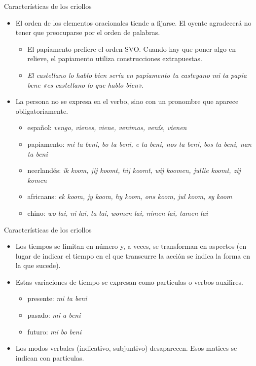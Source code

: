 \documentclass[handout]{beamer}
\begin{document}
\begin{frame}{Características de los criollos}
\begin{itemize}
	\item El orden de los elementos oracionales tiende a fijarse. El oyente agradecerá no tener que preocuparse por el orden de palabras.
	\begin{itemize}
		\item El papiamento prefiere el orden SVO. Cuando hay que poner algo en relieve, el papiamento utiliza construcciones extrapuestas.
		\item \it{El castellano lo hablo bien} sería en papiamento \it{ta casteyano mi ta papia bene} «es castellano lo que hablo bien».
	\end{itemize}
	\item La persona no se expresa en el verbo, sino con un pronombre que aparece obligatoriamente.
	\begin{itemize}
		\item español: \it{vengo, vienes, viene, venimos, venís, vienen}
		\item papiamento: \it{mi ta beni, bo ta beni, e ta beni, nos ta beni, bos ta beni, nan ta beni}
		\item neerlandés: \it{ik koom, jij koomt, hij koomt, wij koomen, jullie koomt, zij komen}
		\item africaans: \it{ek koom, jy koom, hy koom, ons koom, jul koom, sy koom}
		\item chino: \it{wo lai, ni lai, ta lai, women lai, nimen lai, tamen lai}
	\end{itemize}
\end{itemize}
\end{frame}

\begin{frame}{Características de los criollos}
\begin{itemize}
	\item Los tiempos se limitan en número y, a veces, se transforman en aspectos (en lugar de indicar el tiempo en el que transcurre la acción se indica la forma en la que sucede). 
	\item Estas variaciones de tiempo se expresan como partículas o verbos auxilires. 
	\begin{itemize}
		\item presente: \it{mi ta beni}
		\item pasado: \it{mi a beni}
		\item futuro: \it{mi bo beni}
	\end{itemize}
	\item Los modos verbales (indicativo, subjuntivo) desaparecen. Esos matices se indican con partículas.
\end{itemize}
\end{frame}
\end{document}

